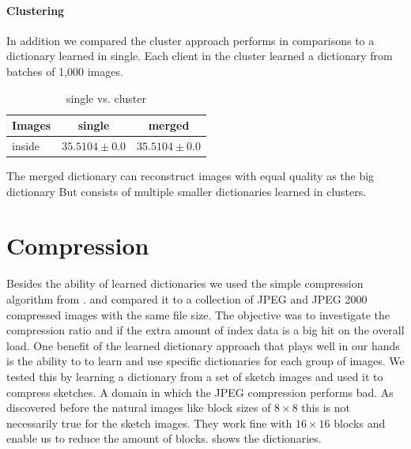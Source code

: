 \paragraph{Clustering}
In addition we compared the cluster approach performs in
comparisons to a dictionary learned in single. Each client in the cluster
learned a dictionary from batches of 1,000 images.

\begin{table}[h]
\centering
\begin{tabular}{| l | c | c |}
\hline\hline
Images & single & merged \\
\hline
inside & $35.5104 \pm 0.0$ & $35.5104 \pm 0.0$  \\
\hline
\end{tabular}
\caption{single vs. cluster}
\end{table}
The merged dictionary can reconstruct images with equal quality as the big
dictionary But consists of multiple smaller dictionaries learned in clusters.


\newpage
\section{Compression}
Besides the ability of learned dictionaries 
we used the simple compression algorithm from  .
and compared it to a collection of JPEG and JPEG 2000 compressed images with the
same file size. The objective was to investigate the compression ratio and if
the extra amount of index data is a big hit on the overall load.
One benefit of the learned dictionary approach that plays well in our
hands is the ability to to learn and use specific dictionaries for each group of
images. We tested this by learning a dictionary from a set of sketch images and
used it to compress sketches. A domain in which the JPEG compression performs
bad. As discovered before the natural images like block sizes of $8\times 8$
this is not necessarily true for the sketch images. They work fine with
$16\times 16$ blocks and enable us to reduce the amount of blocks.
 shows the dictionaries. 



